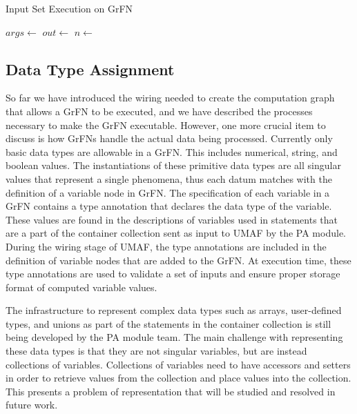 \begin{algorithm}
  \caption{Input Set Execution on GrFN}
  \label{alg:stack_execution}
  \begin{algorithmic}[1]
     
      \State {} 
       
         
          \State $args \gets$ 
          \State $out \gets$ 
          \State $n \gets$  
          \State {}
        \EndFor
      \EndFor
      \State \Return {} 
    \EndProcedure
  \end{algorithmic}
\end{algorithm}

\subsection{Data Type Assignment\label{sec:data_type_assg}}
So far we have introduced the wiring needed to create the computation graph that allows a GrFN to be executed, and we have described the processes necessary to make the GrFN executable.
However, one more crucial item to discuss is how GrFNs handle the actual data being processed.
Currently only basic data types are allowable in a GrFN.
This includes numerical, string, and boolean values.
The instantiations of these primitive data types are all singular values that represent a single phenomena, thus each datum matches with the definition of a variable node in GrFN.
The specification of each variable in a GrFN contains a type annotation that declares the data type of the variable.
These values are found in the descriptions of variables used in statements that are a part of the container collection sent as input to UMAF by the PA module.
During the wiring stage of UMAF, the type annotations are included in the definition of variable nodes that are added to the GrFN.
At execution time, these type annotations are used to validate a set of inputs and ensure proper storage format of computed variable values.

The infrastructure to represent complex data types such as arrays, user-defined types, and unions as part of the statements in the container collection is still being developed by the PA module team.
The main challenge with representing these data types is that they are not singular variables, but are instead collections of variables.
Collections of variables need to have accessors and setters in order to retrieve values from the collection and place values into the collection.
This presents a problem of representation that will be studied and resolved in future work.

